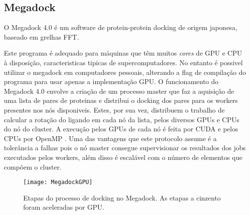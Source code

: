 \subsection {Megadock}
\label{megaD}
O Megadock 4.0\cite{megadock40} é um software de protein-protein docking de origem japonesa, baseado em grelhas FFT.

Este programa é adequado para máquinas que têm muitos \textit{cores} de GPU e CPU à disposição, caracteristicas tipicas de supercomputadores. No entanto é possivel utilizar o megadock em computadores pessoais, alterando a flag de compilação do programa para usar apenas a implementação GPU.
O funcionamento do Megadock 4.0 envolve a criação de um processo master que faz a aquisição de uma lista de pares de proteinas e distribui o docking dos pares para os workers presentes nos nós disponiveis.
 Estes, por sua vez, distribuem o trabalho de calcular a rotação do ligando em cada nó da lista, pelos diversos GPUs e CPUs do nó do cluster. A execução pelos GPUs de cada nó é feita por CUDA e pelos CPUs por OpenMP . 
 Uma das vantagens que este protocolo assume é a tolerância a falhas pois o nó master consegue supervisionar os resultados dos jobs executados pelos workers, além disso é escalável com o número de elementos que compõem o cluster.

   \begin{figure}[ht]
  \centering
    {\texttt{[image: MegadockGPU]}}
  \caption{Etapas do processo de docking no Megadock. As etapas a cinzento foram aceleradas por GPU\cite{shimoda2015protein}. }
  \label{megadockGPU}
\end{figure}

